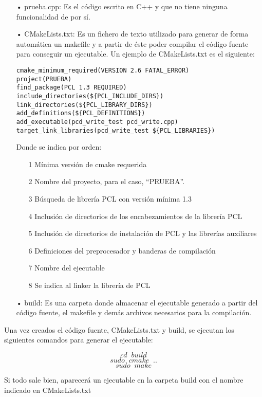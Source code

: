\begin{itemize}
\item[•]prueba.cpp: Es el código escrito en C++ y que no tiene ninguna funcionalidad de por sí. 

\item[•]CMakeLists.txt: Es un fichero de texto utilizado para generar de forma automática un makefile y a partir de éste poder compilar el código fuente para conseguir un ejecutable. Un ejemplo de CMakeLists.txt es el siguiente:

\begin{lstlisting}
cmake_minimum_required(VERSION 2.6 FATAL_ERROR)	
project(PRUEBA)	
find_package(PCL 1.3 REQUIRED)	
include_directories(${PCL_INCLUDE_DIRS})	
link_directories(${PCL_LIBRARY_DIRS})	
add_definitions(${PCL_DEFINITIONS})	
add_executable(pcd_write_test pcd_write.cpp)	
target_link_libraries(pcd_write_test ${PCL_LIBRARIES})	
\end{lstlisting}

Donde se indica por orden: 

\begin{itemize}
\item[1]Mínima versión de cmake requerida
\item[2]Nombre del proyecto, para el caso, ``PRUEBA''.
\item[3]Búsqueda de librería PCL con versión mínima 1.3
\item[4]Inclusión de directorios de los encabezamientos de la librería PCL
\item[5]Inclusión de directorios de instalación de PCL y las librerías auxiliares
\item[6]Definiciones del preprocesador y banderas de compilación
\item[7]Nombre del ejecutable 
\item[8]Se indica al linker la librería de PCL
\end{itemize}

\item[•]build: Es una carpeta donde almacenar el ejecutable generado a partir del código fuente, el makefile y demás archivos necesarios para la compilación.
\end{itemize}

Una vez creados el código fuente, CMakeLists.txt y build, se ejecutan los siguientes comandos para generar el ejecutable:

$$cd \;\; build$$
$$sudo \;\; cmake \;\; ..$$
$$sudo \;\; make$$

Si todo sale bien, aparecerá un ejecutable en la carpeta build con el nombre indicado en CMakeLists.txt

